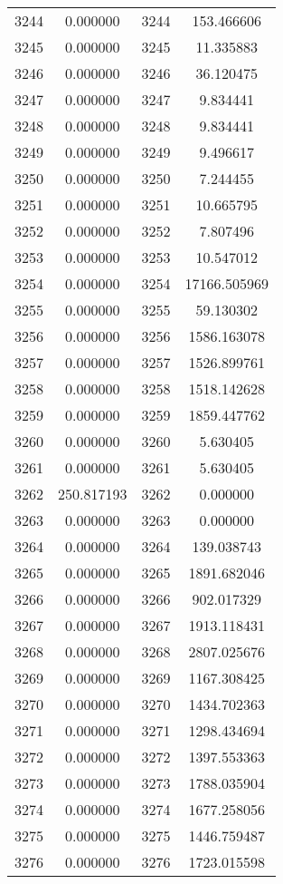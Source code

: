 \documentclass[12pt]{article}
\begin{document}
\begin{longtable}{@{}cccc@{}}
3244 & 0.000000 & 3244 & 153.466606 \\
3245 & 0.000000 & 3245 & 11.335883 \\
3246 & 0.000000 & 3246 & 36.120475 \\
3247 & 0.000000 & 3247 & 9.834441 \\
3248 & 0.000000 & 3248 & 9.834441 \\
3249 & 0.000000 & 3249 & 9.496617 \\
3250 & 0.000000 & 3250 & 7.244455 \\
3251 & 0.000000 & 3251 & 10.665795 \\
3252 & 0.000000 & 3252 & 7.807496 \\
3253 & 0.000000 & 3253 & 10.547012 \\
3254 & 0.000000 & 3254 & 17166.505969 \\
3255 & 0.000000 & 3255 & 59.130302 \\
3256 & 0.000000 & 3256 & 1586.163078 \\
3257 & 0.000000 & 3257 & 1526.899761 \\
3258 & 0.000000 & 3258 & 1518.142628 \\
3259 & 0.000000 & 3259 & 1859.447762 \\
3260 & 0.000000 & 3260 & 5.630405 \\
3261 & 0.000000 & 3261 & 5.630405 \\
3262 & 250.817193 & 3262 & 0.000000 \\
3263 & 0.000000 & 3263 & 0.000000 \\
3264 & 0.000000 & 3264 & 139.038743 \\
3265 & 0.000000 & 3265 & 1891.682046 \\
3266 & 0.000000 & 3266 & 902.017329 \\
3267 & 0.000000 & 3267 & 1913.118431 \\
3268 & 0.000000 & 3268 & 2807.025676 \\
3269 & 0.000000 & 3269 & 1167.308425 \\
3270 & 0.000000 & 3270 & 1434.702363 \\
3271 & 0.000000 & 3271 & 1298.434694 \\
3272 & 0.000000 & 3272 & 1397.553363 \\
3273 & 0.000000 & 3273 & 1788.035904 \\
3274 & 0.000000 & 3274 & 1677.258056 \\
3275 & 0.000000 & 3275 & 1446.759487 \\
3276 & 0.000000 & 3276 & 1723.015598 \\

\end{longtable}
\end{document}
